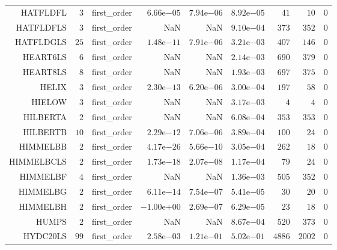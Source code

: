 \begin{longtable}{rrrrrrrrr}
HATFLDFL & \(     3\) & first\_order & \( 6.66\)e\(-05\) & \( 7.94\)e\(-06\) & \( 8.92\)e\(-05\) & \(    41\) & \(    10\) & \(     0\) \\
HATFLDFLS & \(     3\) & first\_order &       NaN &       NaN & \( 9.10\)e\(-04\) & \(   373\) & \(   352\) & \(     0\) \\
HATFLDGLS & \(    25\) & first\_order & \( 1.48\)e\(-11\) & \( 7.91\)e\(-06\) & \( 3.21\)e\(-03\) & \(   407\) & \(   146\) & \(     0\) \\
HEART6LS & \(     6\) & first\_order &       NaN &       NaN & \( 2.14\)e\(-03\) & \(   690\) & \(   379\) & \(     0\) \\
HEART8LS & \(     8\) & first\_order &       NaN &       NaN & \( 1.93\)e\(-03\) & \(   697\) & \(   375\) & \(     0\) \\
HELIX & \(     3\) & first\_order & \( 2.30\)e\(-13\) & \( 6.20\)e\(-06\) & \( 3.00\)e\(-04\) & \(   197\) & \(    58\) & \(     0\) \\
HIELOW & \(     3\) & first\_order &       NaN &       NaN & \( 3.17\)e\(-03\) & \(     4\) & \(     4\) & \(     0\) \\
HILBERTA & \(     2\) & first\_order &       NaN &       NaN & \( 6.08\)e\(-04\) & \(   353\) & \(   353\) & \(     0\) \\
HILBERTB & \(    10\) & first\_order & \( 2.29\)e\(-12\) & \( 7.06\)e\(-06\) & \( 3.89\)e\(-04\) & \(   100\) & \(    24\) & \(     0\) \\
HIMMELBB & \(     2\) & first\_order & \( 4.17\)e\(-26\) & \( 5.66\)e\(-10\) & \( 3.05\)e\(-04\) & \(   262\) & \(    18\) & \(     0\) \\
HIMMELBCLS & \(     2\) & first\_order & \( 1.73\)e\(-18\) & \( 2.07\)e\(-08\) & \( 1.17\)e\(-04\) & \(    79\) & \(    24\) & \(     0\) \\
HIMMELBF & \(     4\) & first\_order &       NaN &       NaN & \( 1.36\)e\(-03\) & \(   505\) & \(   352\) & \(     0\) \\
HIMMELBG & \(     2\) & first\_order & \( 6.11\)e\(-14\) & \( 7.54\)e\(-07\) & \( 5.41\)e\(-05\) & \(    30\) & \(    20\) & \(     0\) \\
HIMMELBH & \(     2\) & first\_order & \(-1.00\)e\(+00\) & \( 2.69\)e\(-07\) & \( 6.29\)e\(-05\) & \(    23\) & \(    18\) & \(     0\) \\
HUMPS & \(     2\) & first\_order &       NaN &       NaN & \( 8.67\)e\(-04\) & \(   520\) & \(   373\) & \(     0\) \\
HYDC20LS & \(    99\) & first\_order & \( 2.58\)e\(-03\) & \( 1.21\)e\(-01\) & \( 5.02\)e\(-01\) & \(  4886\) & \(  2002\) & \(     0\) \\

\end{longtable}
